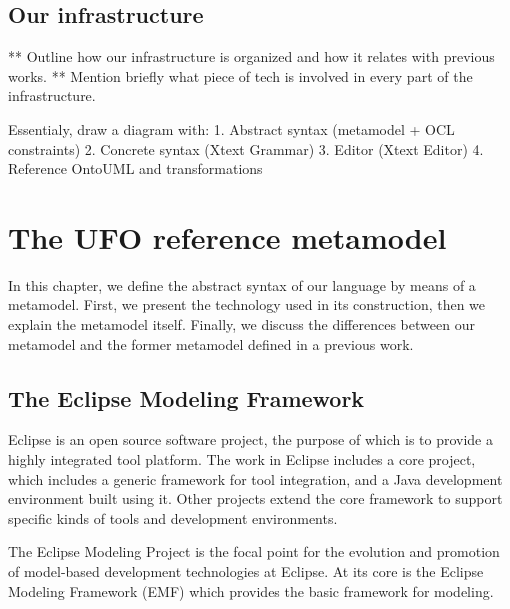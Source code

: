 \documentclass[
	10pt,				%
	oneside,
	a4paper,			%
	brazil,
	english
	]{abntex2}
\begin{document}
%

\section{Our infrastructure}

** Outline how our infrastructure is organized and how it relates with previous works.
** Mention briefly what piece of tech is involved in every part of the infrastructure.

Essentialy, draw a diagram with:
1. Abstract syntax (metamodel + OCL constraints)
2. Concrete syntax (Xtext Grammar)
3. Editor (Xtext Editor)
4. Reference OntoUML and transformations

\chapter{The UFO reference metamodel}

In this chapter, we define the abstract syntax of our language by means of a
metamodel. First, we present the technology used in its construction, then we
explain the metamodel itself. Finally, we discuss the differences between our
metamodel and the former metamodel defined in a previous work.


\section{The Eclipse Modeling Framework}

Eclipse is an open source software project, the purpose of which is to provide
a highly integrated tool platform. The work in Eclipse includes a core project,
which includes a generic framework for tool integration, and a Java development
environment built using it. Other projects extend the core framework to support
specific kinds of tools and development environments.

The Eclipse Modeling Project is the focal point for the evolution and promotion
of model-based development technologies at Eclipse. At its core is the Eclipse
Modeling Framework (EMF) \cite{budinsky09} which provides the basic framework for modeling.
\end{document}
